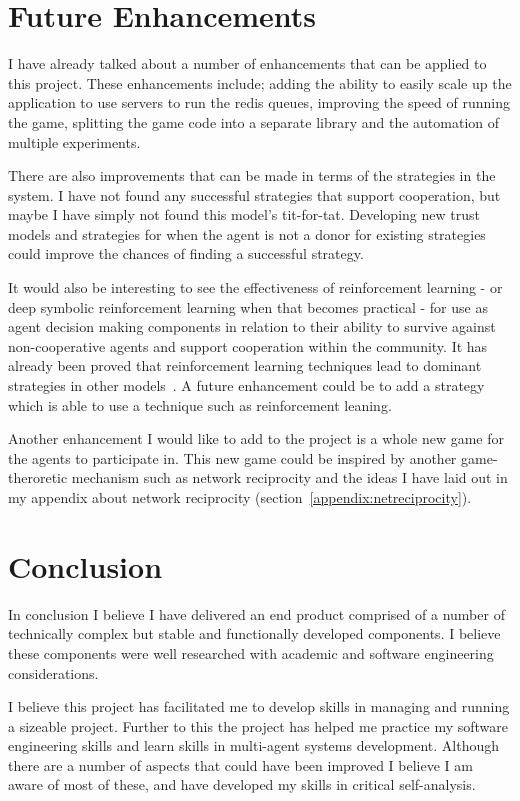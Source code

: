 \documentclass[]{final_report}
\begin{document}
\section{Future Enhancements}
I have already talked about a number of enhancements that can be applied to this project. These enhancements include; adding the ability to easily scale up the application to use servers to run the redis queues, improving the speed of running the game, splitting the game code into a separate library and the automation of multiple experiments.\par 
There are also improvements that can be made in terms of the strategies in the system. I have not found any successful strategies that support cooperation, but maybe I have simply not found this model's tit-for-tat. Developing new trust models and strategies for when the agent is not a donor for existing strategies could improve  the chances of finding a successful strategy.\par 
It would also be interesting to see the effectiveness of reinforcement learning - or deep symbolic reinforcement learning when that becomes practical - for use as agent decision making components in relation to their ability to survive against non-cooperative agents and support cooperation within the community. It has already been proved that reinforcement learning techniques lead to dominant strategies in other models~\cite{harper2017reinforcement}. A future enhancement could be to add a strategy which is able to use a technique such as reinforcement leaning.\par 
Another enhancement I would like to add to the project is a whole new game for the agents to participate in. This new game could be inspired by another game-theroretic mechanism such as network reciprocity and the ideas I have laid out in my appendix about network reciprocity (section~\ref{appendix:netreciprocity}).

\section{Conclusion}
In conclusion I believe I have delivered an end product comprised of a number of technically complex but stable and functionally developed components. I believe these components were well researched with academic and software engineering considerations.\par 
I believe this project has facilitated me to develop skills in managing and running a sizeable project. Further to this the project has helped me practice my software engineering skills and learn skills in multi-agent systems development. Although there are a number of aspects that could have been improved I believe I am aware of most of these, and have developed my skills in critical self-analysis.
\end{document}
